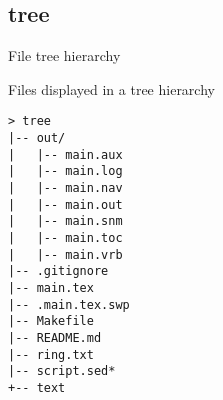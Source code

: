 \subsection{tree}
\begin{frame}[fragile]{File tree hierarchy}
  \begin{exampleblock}{Files displayed in a tree hierarchy}
    \begin{lstlisting}[showstringspaces=false, basicstyle=\tiny]
> tree
|-- out/
|   |-- main.aux
|   |-- main.log
|   |-- main.nav
|   |-- main.out
|   |-- main.snm
|   |-- main.toc
|   |-- main.vrb
|-- .gitignore
|-- main.tex
|-- .main.tex.swp
|-- Makefile
|-- README.md
|-- ring.txt
|-- script.sed*
+-- text
    \end{lstlisting}
  \end{exampleblock}
\end{frame}

